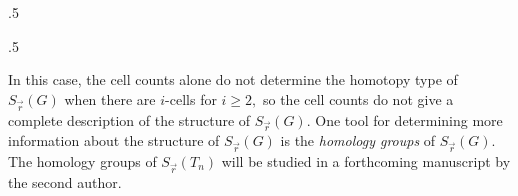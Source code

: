 \documentclass{amsart}
\newcommand{\Sr}{S_{\vec{r}}}
\theoremstyle{definition}
\theoremstyle{remark}
\begin{document}
\begin{table}[h!]
\begin{subtable}{.5\linewidth}
    \centering
\end{subtable}
\hspace*{-5mm}
\begin{subtable}{.5\linewidth}
    \centering
\end{subtable}
\caption{Cell counts of $\Sr(T_4)$ (left) and $\Sr(K_5)$ (right)}
\label{tab:CellCountsB}
\end{table}

In this case, the cell counts alone do not determine the homotopy type of $\Sr(G)$ when there are $i$-cells for $i\ge 2,$ so the cell counts do not give a complete description of the structure of $\Sr(G).$ One tool for determining more information about the structure of $\Sr(G)$ is the \textit{homology groups} of $\Sr(G)$. The homology groups of $\Sr(T_n)$ will be studied in a forthcoming manuscript by the second author.



\end{document}
